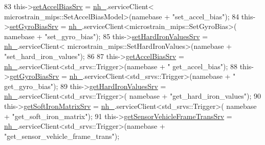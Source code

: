 \begin{DoxyCode}
83                 this->\hyperlink{classcl__microstrain__mips_1_1ClMicrostainMips_ae2ea11655cba06e49307780d1f95e197}{setAccelBiasSrv} = \hyperlink{classcl__microstrain__mips_1_1ClMicrostainMips_a5a39ba0864ba2c4c003b6ea427538243}{nh\_}.serviceClient<
      microstrain\_mips::SetAccelBiasModel>(namebase + \textcolor{stringliteral}{"set\_accel\_bias"});
84                 this->\hyperlink{classcl__microstrain__mips_1_1ClMicrostainMips_a29fcea0897ca3bd7a036ab5c1856b86c}{setGyroBiasSrv} = \hyperlink{classcl__microstrain__mips_1_1ClMicrostainMips_a5a39ba0864ba2c4c003b6ea427538243}{nh\_}.serviceClient<microstrain\_mips::SetGyroBias>(
      namebase + \textcolor{stringliteral}{"set\_gyro\_bias"});
85                 this->\hyperlink{classcl__microstrain__mips_1_1ClMicrostainMips_abab500a095515c133d5edfea23736fad}{setHardIronValuesSrv} = \hyperlink{classcl__microstrain__mips_1_1ClMicrostainMips_a5a39ba0864ba2c4c003b6ea427538243}{nh\_}.serviceClient<
      microstrain\_mips::SetHardIronValues>(namebase + \textcolor{stringliteral}{"set\_hard\_iron\_values"});
86 
87                 this->\hyperlink{classcl__microstrain__mips_1_1ClMicrostainMips_a79547e77f9122ca67610f153657ec8ac}{getAccelBiasSrv} = \hyperlink{classcl__microstrain__mips_1_1ClMicrostainMips_a5a39ba0864ba2c4c003b6ea427538243}{nh\_}.serviceClient<std\_srvs::Trigger>(namebase + \textcolor{stringliteral}{"
      get\_accel\_bias"});
88                 this->\hyperlink{classcl__microstrain__mips_1_1ClMicrostainMips_a2f3eaec7f31a54d833773ebb5eb03b64}{getGyroBiasSrv} = \hyperlink{classcl__microstrain__mips_1_1ClMicrostainMips_a5a39ba0864ba2c4c003b6ea427538243}{nh\_}.serviceClient<std\_srvs::Trigger>(namebase + \textcolor{stringliteral}{"
      get\_gyro\_bias"});
89                 this->\hyperlink{classcl__microstrain__mips_1_1ClMicrostainMips_a11169f770102e9cff7f3b45c96fb4881}{getHardIronValuesSrv} = \hyperlink{classcl__microstrain__mips_1_1ClMicrostainMips_a5a39ba0864ba2c4c003b6ea427538243}{nh\_}.serviceClient<std\_srvs::Trigger>(
      namebase + \textcolor{stringliteral}{"get\_hard\_iron\_values"});
90                 this->\hyperlink{classcl__microstrain__mips_1_1ClMicrostainMips_a7210454a851669073d06d82511014ecc}{getSoftIronMatrixSrv} = \hyperlink{classcl__microstrain__mips_1_1ClMicrostainMips_a5a39ba0864ba2c4c003b6ea427538243}{nh\_}.serviceClient<std\_srvs::Trigger>(
      namebase + \textcolor{stringliteral}{"get\_soft\_iron\_matrix"});
91                 this->\hyperlink{classcl__microstrain__mips_1_1ClMicrostainMips_abeafc4f48f26ddd264e61b6cf97c779f}{getSensorVehicleFrameTransSrv} = 
      \hyperlink{classcl__microstrain__mips_1_1ClMicrostainMips_a5a39ba0864ba2c4c003b6ea427538243}{nh\_}.serviceClient<std\_srvs::Trigger>(namebase + \textcolor{stringliteral}{"get\_sensor\_vehicle\_frame\_trans"});

\end{DoxyCode}
